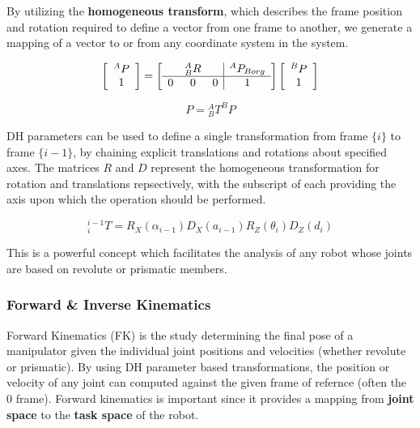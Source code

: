 \documentclass[journal]{IEEEtran}
\begin{document}
By utilizing the \textbf{homogeneous transform}, which describes the frame position and rotation required to define a vector from one frame to another, we generate a mapping of a vector to or from any coordinate system in the system.

\begin{equation}
    $$
    \left[\begin{array}{c}
    {}^{A}P \\
    1
    \end{array}\right]=\left[\begin{array}{ccc|c}
    {} & {}^{A}_{B}R & & {}^{A}P_{B org} \\
    \hline 0 & 0 & 0 & 1
    \end{array}\right]\left[\begin{array}{c}
    {}^{B}P \\
    1
    \end{array}\right]
    $$
\end{equation}


\begin{equation}
        P = { }_{B}^{A} T^{B} P
\end{equation}

DH parameters can be used to define a single transformation from frame $\{ i\}$ to frame $\{ i-1 \}$, by chaining explicit translations and rotations about specified axes. The matrices $R$ and $D$ represent the homogeneous transformation for rotation and translations repsectively, with the subscript of each providing the axis upon which the operation should be performed.

$$
{ }_{i}^{i-1} T=R_{X}\left(\alpha_{i-1}\right) D_{X}\left(a_{i-1}\right) R_{Z}\left(\theta_{i}\right) D_{Z}\left(d_{i}\right)
$$

This is a powerful concept which facilitates the analysis of any robot whose joints are based on revolute or prismatic members. \\

\subsubsection{Forward \& Inverse Kinematics}

Forward Kinematics (FK) is the study determining the final pose of a manipulator given the individual joint positions and velocities (whether revolute or prismatic). By using DH parameter based transformations, the position or velocity of any joint can computed against the given frame of refernce (often the {0} frame). Forward kinematics is important since it provides a mapping from \textbf{joint space} to the \textbf{task space} of the robot. \\
\end{document}
